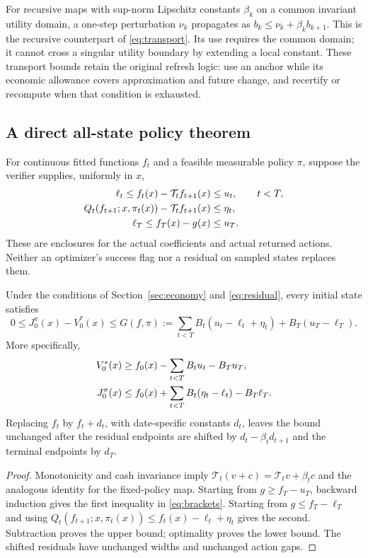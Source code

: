 \documentclass[ecta,nameyear,draft]{econsocart}
\begin{document}
For recursive maps with sup-norm Lipschitz constants $\beta_k$ on a common invariant utility domain, a one-step perturbation $\nu_k$ propagates as $b_k\leq\nu_k+\beta_kb_{k+1}$. This is the recursive counterpart of \eqref{eq:transport}. Its use requires the common domain; it cannot cross a singular utility boundary by extending a local constant. These transport bounds retain the original refresh logic: use an anchor while its economic allowance covers approximation and future change, and recertify or recompute when that condition is exhausted.

\subsection{A direct all-state policy theorem}
For continuous fitted functions $f_t$ and a feasible measurable policy $\pi$, suppose the verifier supplies, uniformly in $x$,
\begin{align}\label{eq:residual}
 \ell_t\leq f_t(x)-\mathcal T_tf_{t+1}(x)&\leq u_t,\qquad t<T,\\
 Q_t(f_{t+1};x,\pi_t(x))-\mathcal T_tf_{t+1}(x)&\leq\eta_t,\notag\\
 \ell_T\leq f_T(x)-g(x)&\leq u_T.\notag
\end{align}
These are enclosures for the actual coefficients and actual returned actions. Neither an optimizer's success flag nor a residual on sampled states replaces them.

\begin{theorem}\label{thm:policy}
Under the conditions of Section~\ref{sec:economy} and \eqref{eq:residual}, every initial state satisfies
\begin{equation}\label{eq:gap}
 0\leq J^\pi_0(x)-V_0^*(x)\leq
 G(f,\pi):=\sum_{t<T}B_t(u_t-\ell_t+\eta_t)+B_T(u_T-\ell_T).
\end{equation}
More specifically,
\begin{align}\label{eq:brackets}
 V_0^*(x)&\geq f_0(x)-\sum_{t<T}B_tu_t-B_Tu_T,\\
 J_0^\pi(x)&\leq f_0(x)+\sum_{t<T}B_t(\eta_t-\ell_t)-B_T\ell_T.\notag
\end{align}
Replacing $f_t$ by $f_t+d_t$, with date-specific constants $d_t$, leaves the bound unchanged after the residual endpoints are shifted by $d_t-\beta_td_{t+1}$ and the terminal endpoints by $d_T$.
\end{theorem}

\begin{proof}
Monotonicity and cash invariance imply
$\mathcal T_t(v+c)=\mathcal T_tv+\beta_tc$ and the analogous identity for the fixed-policy map. Starting from $g\geq f_T-u_T$, backward induction gives the first inequality in \eqref{eq:brackets}. Starting from $g\leq f_T-\ell_T$ and using
$Q_t(f_{t+1};x,\pi_t(x))\leq f_t(x)-\ell_t+\eta_t$
gives the second. Subtraction proves the upper bound; optimality proves the lower bound. The shifted residuals have unchanged widths and unchanged action gaps.
\end{proof}
\end{document}
